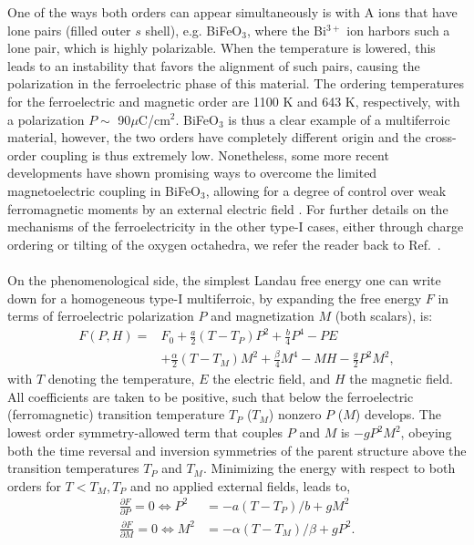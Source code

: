 One of the ways both orders can appear simultaneously is with A ions that have lone pairs (filled outer $s$ shell), e.g. BiFeO$_3$, where the Bi$^{3+}$ ion harbors such a lone pair, which is highly polarizable.
When the temperature is lowered, this leads to an instability that favors the alignment of such pairs, causing the polarization in the ferroelectric phase of this material.
The ordering temperatures for the ferroelectric and magnetic order are 1100 K and 643 K, respectively, with a polarization $P \sim$ 90$\mu$C/cm$^2$.
BiFeO$_3$ is thus a clear example of a multiferroic material, however, the two orders have completely different origin and the cross-order coupling is thus extremely low.
Nonetheless, some more recent developments have shown promising ways to overcome the limited magnetoelectric coupling in BiFeO$_3$, allowing for a degree of control over weak ferromagnetic moments by an external electric field \cite{Heron14}. 
For further details on the mechanisms of the ferroelectricity in the other type-I cases, either through charge ordering or tilting of the oxygen octahedra, we refer the reader back to Ref.~\cite{Khomskii2009}.
\\\\
On the phenomenological side, the simplest Landau free energy one can write down for a homogeneous type-I multiferroic, by expanding the free energy $F$ in terms of ferroelectric polarization $P$ and magnetization $M$ (both scalars), is:
\begin{align}
	F(P, H) =& F_0 + \frac{a}{2} (T-T_P) P^2 + \frac{b}{4} P^4 - P E \\
	&+\frac{\alpha}{2} (T-T_M)M^2 + \frac{\beta}{4} M^4 - MH - \frac{g}{2}P^2 M^2,
\end{align}
with $T$ denoting the temperature, $E$ the electric field, and $H$ the magnetic field.
All coefficients are taken to be positive, such that below the ferroelectric (ferromagnetic) transition temperature $T_P$ ($T_M$) nonzero $P$ ($M$) develops.
The lowest order symmetry-allowed term that couples $P$ and $M$ is $-gP^2M^2$, obeying both the time reversal and inversion symmetries of the parent structure above the transition temperatures $T_P$ and $T_M$.
Minimizing the energy with respect to both orders for $T<T_M,T_P$ and no applied external fields, leads to,
\begin{align}
	\frac{\partial F}{\partial P} = 0 \Leftrightarrow P^2 &= - a(T-T_P)/b + gM^2\\
	\frac{\partial F}{\partial M} = 0 \Leftrightarrow M^2 &= - \alpha(T-T_M)/\beta + gP^2.
\end{align}
